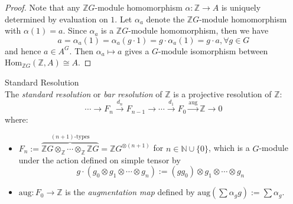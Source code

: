 \begin{proof}
Note that any $\mathbb{Z}G$-module homomorphism $\alpha:\mathbb{Z} \to A$ is uniquely determined by evaluation on $1$. Let $\alpha_a$ denote the $\mathbb ZG$-module homomorphism with $\alpha(1)=a$. Since $\alpha_a$ is a $\mathbb{Z}G$-module homomorphism, then we have
\[
a= \alpha_a (1)=\alpha_a (g\cdot 1)=g\cdot \alpha_a(1)=g\cdot a,\forall g\in G
\]
and hence $a\in A^G$. Then $\alpha_a \mapsto a$ gives a $G$-module isomorphism between $\text{Hom}_{\mathbb{Z}G} (\mathbb{Z},A) \cong A$.
\end{proof}

\begin{definition}{Standard Resolution}\\
The \textit{standard resolution} or \textit{bar resolution} of $\mathbb{Z}$ is a projective resolution of $\mathbb{Z}$:
\[
\cdots \to F_n\xrightarrow{d_n} F_{n-1} \to \cdots \xrightarrow{d_1} F_0\xrightarrow{\text{aug}} \mathbb{Z} \to0
\]
where:
\begin{itemize}
    \item $F_n:= \overbrace{\mathbb{Z}G \otimes_\mathbb{Z} \cdots \otimes_\mathbb{Z} \mathbb{Z}G}^{(n+1)\text{-types}} = \mathbb{Z}G^{\otimes (n+1)}$ for $n\in \mathbb{N} \cup \{0\}$, which is a $G$-module under the action defined on simple tensor by
    \[
    g \cdot (g_0 \otimes g_1 \otimes \cdots \otimes g_n):= (gg_0) \otimes g_1 \otimes \cdots \otimes g_n
    \]

    \item $\text{aug}: F_0\to \mathbb{Z}$ is the \textit{augmentation map} defined by $\text{aug} (\sum \alpha_gg) := \sum\alpha_g$.


\end{itemize}
\end{definition}
